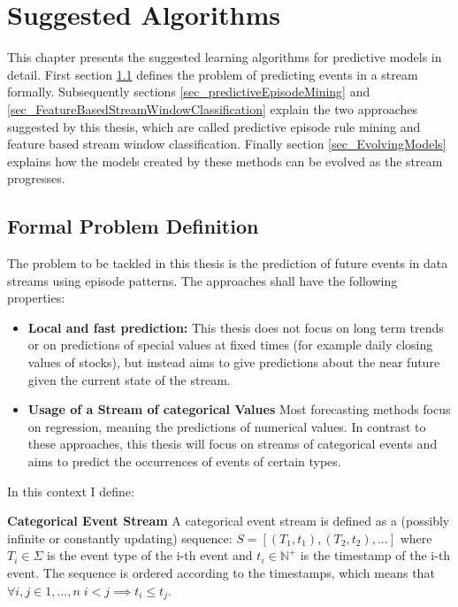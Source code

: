 \chapter{Suggested Algorithms}
\label{chapter_solutions}

\ifpdf
    \graphicspath{{Chapter4/Figs/Raster/}{Chapter4/Figs/PDF/}{Chapter4/Figs/}}
\else
    \graphicspath{{Chapter4/Figs/Vector/}{Chapter4/Figs/}}
\fi

This chapter presents the suggested learning algorithms for predictive models in detail. First section \ref{sec_formalProblemDef} defines the problem of predicting events in a stream formally. Subsequently sections \ref{sec_predictiveEpisodeMining} and \ref{sec_FeatureBasedStreamWindowClassification} explain the two approaches suggested by this thesis, which are called predictive episode rule mining and feature based stream window classification. Finally section \ref{sec_EvolvingModels} explains how the models created by these methods can be evolved as the stream progresses.

\section{Formal Problem Definition}
\label{sec_formalProblemDef}
The problem to be tackled in this thesis is the prediction of future events in data streams using episode patterns. The approaches shall have the following properties:

\begin{itemize}
	\item \textbf{Local and fast prediction:} This thesis does not focus on long term trends or on predictions of special values at fixed times (for example daily closing values of stocks), but instead aims to give predictions about the near future given the current state of the stream.
	\item \textbf{Usage of a Stream of categorical Values} Most forecasting methods focus on regression, meaning the predictions of numerical values. In contrast to these approaches, this thesis will focus on streams of categorical events and aims to predict the occurrences of events of certain types.
\end{itemize}

In this context I define:

\begin{mydef}
\textbf{Categorical Event Stream} A categorical event stream is defined as a (possibly infinite or constantly updating) sequence: $S = [ (T_1,t_1),(T_2,t_2),... ] $ where $T_i \in \Sigma$ is the event type of the i-th event and $t_i \in \mathbb{N}^+$ is the timestamp of the i-th event. The sequence is ordered according to the timestamps, which means that $\forall i,j \in {1,...,n} \; i<j \implies t_i \leq t_j$.
\end{mydef}

